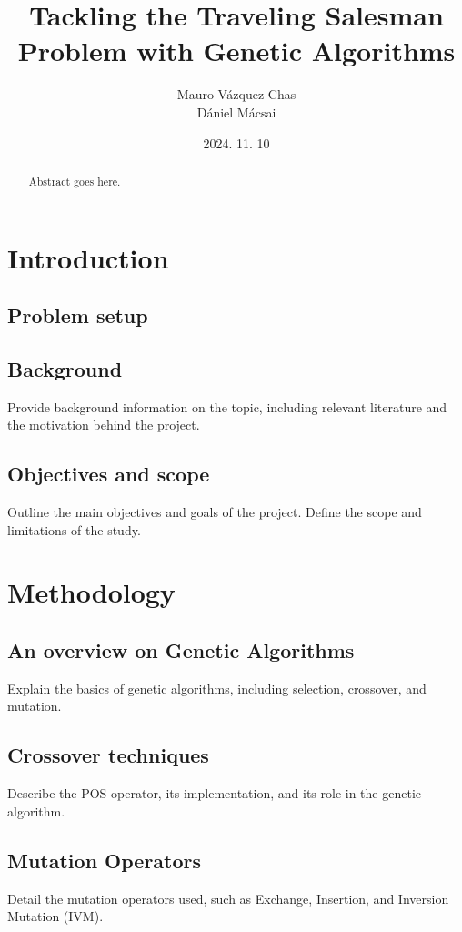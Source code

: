 \documentclass[12pt]{article}
\title{%
    \vspace{2in} %
    \textbf{Tackling the Traveling Salesman Problem with Genetic Algorithms}\\
    \vspace{2in}
}
\author{
    Mauro Vázquez Chas \\
    Dániel Mácsai
    \vspace{0.2in}
}
\date{2024. 11. 10}
\begin{document}
\maketitle
\thispagestyle{empty}

\begin{abstract}
    \noindent
    Abstract goes here.
\end{abstract}

\newpage

\tableofcontents
\newpage


\section{Introduction}

\subsection{Problem setup}

\subsection{Background}
Provide background information on the topic, including relevant literature and the motivation behind the project.

\subsection{Objectives and scope}
Outline the main objectives and goals of the project. Define the scope and limitations of the study.

\section{Methodology}
\subsection{An overview on Genetic Algorithms}
Explain the basics of genetic algorithms, including selection, crossover, and mutation.

\subsection{Crossover techniques}
Describe the POS operator, its implementation, and its role in the genetic algorithm.

\subsection{Mutation Operators}
Detail the mutation operators used, such as Exchange, Insertion, and Inversion Mutation (IVM).
\end{document}
